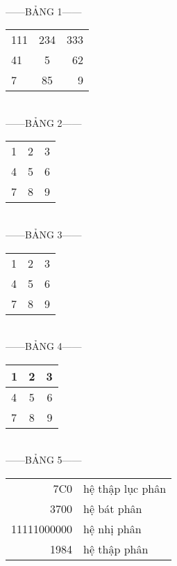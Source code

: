 \documentclass{report}
\begin{document}
\hfill\\
------BẢNG 1------\\[0.3cm]
\begin{tabular}{ l c r }
  111 & 234 & 333 \\
  41  & 5    & 62 \\
  7    & 85  & 9 \\
\end{tabular}

\hfill\\[1cm]
------BẢNG 2------\\[0.3cm]
\begin{tabular}{ l | c || r | }
  1 & 2 & 3 \\
  4 & 5 & 6 \\
  7 & 8 & 9 \\
\end{tabular}

\hfill\\[1cm]
------BẢNG 3------\\[0.3cm]
\begin{tabular}{ l | c || r | }
  \hline                       
  1 & 2 & 3 \\
  4 & 5 & 6 \\
  7 & 8 & 9 \\
  \hline  
\end{tabular}

\hfill\\[1cm]
------BẢNG 4------\\[0.3cm]
\begin{center}
  \begin{tabular}{ l | c || r | }
    \hline
    1 & 2 & 3 \\ \hline
    4 & 5 & 6 \\ \hline
    7 & 8 & 9 \\
    \hline
  \end{tabular}
\end{center}

\hfill\\[1cm]
------BẢNG 5------\\[0.3cm]
\begin{tabular}{ | r | l | }
  \hline
  7C0 & hệ thập lục phân \\
  3700 & hệ bát phân \\ \cline{2-2}
  11111000000 & hệ nhị phân\\
  \hline \hline
  1984 & hệ thập phân \\
  \hline
\end{tabular}
\end{document}
